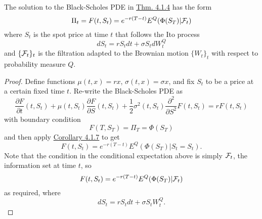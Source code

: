 \documentclass[11pt,fleqn]{book} %
\begin{document}
\begin{corollary} \label{cor:418}
The solution to the Black-Scholes PDE in \hyperref[thm:414]{Thm. 4.1.4} has the form
\[
\Pi_t = F(t, S_t) = e^{-r(T - t)}E^Q(\Phi(S_T)|\mathcal{F}_t)
\]
where \(S_t\) is the spot price at time \(t\) that follows the Ito process
\[
dS_t = rS_tdt + \sigma S_tdW_t^Q
\]
and \(\{\mathcal{F}_t\}_t\) is the filtration adapted to the Brownian motion \(\{W_t\}_t\) with respect to probability measure \(Q\).
\end{corollary}
\begin{proof}
Define functions \(\mu(t, x) = rx\), \(\sigma(t, x) = \sigma x\), and fix \(S_t\) to be a price at a certain fixed time \(t\). Re-write the Black-Scholes PDE as
\[
\frac{\partial F}{\partial t}(t, S_t) + \mu(t, S_t)\frac{\partial F}{\partial S}(t, S_t) + \frac12\sigma^2(t, S_t)\frac{\partial^2}{\partial S^2}F(t, S_t) = rF(t, S_t)
\]
with boundary condition
\[
F(T, S_T) = \Pi_T = \Phi(S_T)
\]
and then apply \hyperref[cor:417]{Corollary 4.1.7} to get
\[
F(t, S_t) = e^{-r(T - t)}E^Q(\Phi(S_T) | S_t = S_t).
\]
\indent Note that the condition in the conditional expectation above is simply \(\mathcal{F}_t\), the information set at time \(t\), so
\[
F(t, S_t) = e^{-r(T - t)}E^Q(\Phi(S_T)|\mathcal{F}_t)
\]
as required, where
\[
dS_t = rS_tdt + \sigma S_tW_t^Q.
\]
\end{proof}
\end{document}
